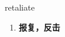 
\begin{frame}
{\huge retaliate}
\begin{center}
\begin{enumerate}\Large
  \item \textbf{报复，反击}
\end{enumerate}
\end{center}
\end{frame}
